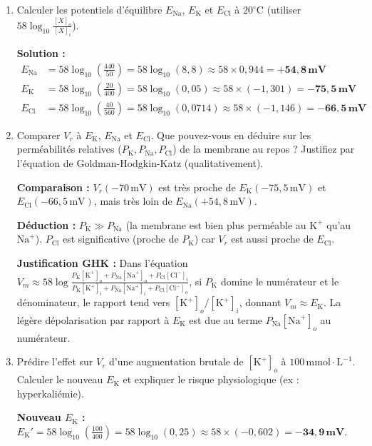 \documentclass[11pt]{article}
\begin{document}
\begin{exercice}
\begin{enumerate}
\item Calculer les potentiels d'équilibre $E_{\text{Na}}$, $E_{\text{K}}$ et $E_{\text{Cl}}$ à $20^\circ\text{C}$ (utiliser $58 \log_{10}\frac{[X]_o}{[X]_i}$).
\par \textbf{Solution :}
\begin{align*}
E_{\text{Na}} &= 58 \log_{10}\left(\frac{440}{50}\right) = 58 \log_{10}(8,8) \approx 58 \times 0,944 = \mathbf{+54,8\,mV} \\
E_{\text{K}} &= 58 \log_{10}\left(\frac{20}{400}\right) = 58 \log_{10}(0,05) \approx 58 \times (-1,301) = \mathbf{-75,5\,mV} \\
E_{\text{Cl}} &= 58 \log_{10}\left(\frac{40}{560}\right) = 58 \log_{10}(0,0714) \approx 58 \times (-1,146) = \mathbf{-66,5\,mV}
\end{align*}
\item Comparer $V_r$ à $E_{\text{K}}$, $E_{\text{Na}}$ et $E_{\text{Cl}}$. Que pouvez-vous en déduire sur les perméabilités relatives ($P_{\text{K}}, P_{\text{Na}}, P_{\text{Cl}}$) de la membrane au repos ? Justifiez par l'équation de Goldman-Hodgkin-Katz (qualitativement).
\par \textbf{Comparaison :} $V_r (-70\,\text{mV})$ est très proche de $E_{\text{K}} (-75,5\,\text{mV})$ et $E_{\text{Cl}} (-66,5\,\text{mV})$, mais très loin de $E_{\text{Na}} (+54,8\,\text{mV})$.
\par \textbf{Déduction :} $P_{\text{K}} \gg P_{\text{Na}}$ (la membrane est bien plus perméable au $\text{K}^+$ qu'au $\text{Na}^+$). $P_{\text{Cl}}$ est significative (proche de $P_{\text{K}}$) car $V_r$ est aussi proche de $E_{\text{Cl}}$.
\par \textbf{Justification GHK :} Dans l'équation $V_m \approx 58 \log \frac{P_{\text{K}}[\text{K}^+]_o + P_{\text{Na}}[\text{Na}^+]_o + P_{\text{Cl}}[\text{Cl}^-]_i}{P_{\text{K}}[\text{K}^+]_i + P_{\text{Na}}[\text{Na}^+]_i + P_{\text{Cl}}[\text{Cl}^-]_o}$, si $P_{\text{K}}$ domine le numérateur et le dénominateur, le rapport tend vers $[\text{K}^+]_o/[\text{K}^+]_i$, donnant $V_m \approx E_{\text{K}}$. La légère dépolarisation par rapport à $E_{\text{K}}$ est due au terme $P_{\text{Na}}[\text{Na}^+]_o$ au numérateur.
\item Prédire l'effet sur $V_r$ d'une augmentation brutale de $[\text{K}^+]_o$ à $100\,\text{mmol}\cdot\text{L}^{-1}$. Calculer le nouveau $E_{\text{K}}$ et expliquer le risque physiologique (ex : hyperkaliémie).
\par \textbf{Nouveau $E_{\text{K}}$ :} $E_{\text{K}}' = 58 \log_{10}\left(\frac{100}{400}\right) = 58 \log_{10}(0,25) \approx 58 \times (-0,602) = \mathbf{-34,9\,mV}$.

\end{enumerate}
\end{exercice}
\end{document}
